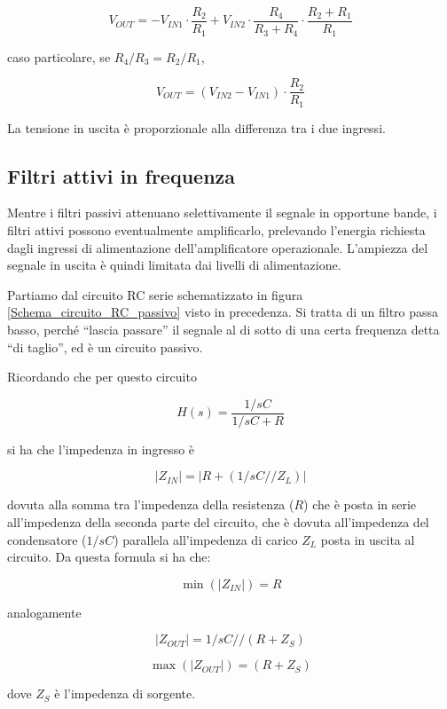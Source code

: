 \documentclass{article}
\begin{document}
\[V_{OUT} = - V_{IN1} \cdot \frac{R_2}{R_1} + V_{IN2} \cdot \frac{R_4}{R_3 + R_4} \cdot \frac{R_2 + R_1}{R_1}\]

caso particolare, se $R_4 / R_3 = R_2 / R_1$,

\[V_{OUT} = (V_{IN2} - V_{IN1}) \cdot \frac{R_2}{R_1}\]

La tensione in uscita è proporzionale alla differenza tra i due ingressi.









\clearpage
\subsection{Filtri attivi in frequenza}

Mentre i filtri passivi attenuano selettivamente il segnale in opportune bande, i filtri attivi possono eventualmente amplificarlo, prelevando l'energia richiesta dagli ingressi di alimentazione dell'amplificatore operazionale. L'ampiezza del segnale in uscita è quindi limitata dai livelli di alimentazione.

\vspace{3mm}

Partiamo dal circuito RC serie schematizzato in figura \ref{Schema_circuito_RC_passivo} visto in precedenza. Si tratta di un filtro passa basso, perché ``lascia passare'' il segnale al di sotto di una certa frequenza detta ``di taglio'', ed è un circuito passivo.

\vspace{1mm}

Ricordando che per questo circuito

\[H(s) = \frac{1/sC}{1/sC + R}\]

si ha che l'impedenza in ingresso è

\[|Z_{IN}|=|R + (1/sC // Z_L)|\]

dovuta alla somma tra l'impedenza della resistenza ($R$) che è posta in serie all'impedenza della seconda parte del circuito, che è dovuta all'impedenza del condensatore ($1/sC$) parallela all'impedenza di carico $Z_L$ posta in uscita al circuito. Da questa formula si ha che:

\[\min(|Z_{IN}|) = R\]

analogamente

\[|Z_{OUT}|= 1/sC // (R + Z_S)\]

\[\max(|Z_{OUT}|) = (R + Z_S)\]

dove $Z_S$ è l'impedenza di sorgente.
\end{document}
